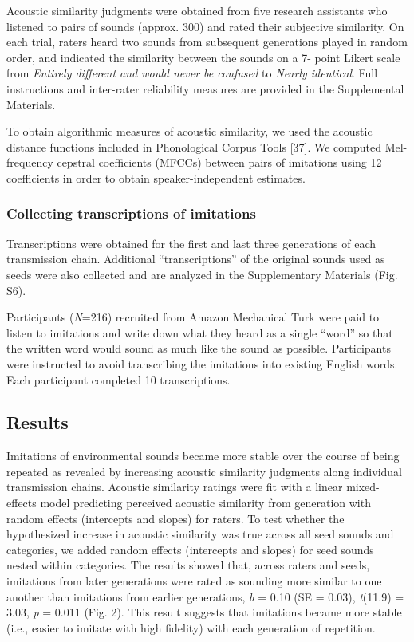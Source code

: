 \documentclass[english,floatsintext,man]{apa6}
\theoremstyle{definition}
\theoremstyle{definition}
\theoremstyle{definition}
\theoremstyle{remark}
\begin{document}
Acoustic similarity judgments were obtained from five research
assistants who listened to pairs of sounds (approx. 300) and rated their
subjective similarity. On each trial, raters heard two sounds from
subsequent generations played in random order, and indicated the
similarity between the sounds on a 7- point Likert scale from
\emph{Entirely different and would never be confused} to \emph{Nearly
identical}. Full instructions and inter-rater reliability measures are
provided in the Supplemental Materials.

To obtain algorithmic measures of acoustic similarity, we used the
acoustic distance functions included in Phonological Corpus Tools
{[}37{]}. We computed Mel-frequency cepstral coefficients (MFCCs)
between pairs of imitations using 12 coefficients in order to obtain
speaker-independent estimates.

\hypertarget{collecting-transcriptions-of-imitations}{%
\subsubsection{Collecting transcriptions of
imitations}\label{collecting-transcriptions-of-imitations}}

Transcriptions were obtained for the first and last three generations of
each transmission chain. Additional \enquote{transcriptions} of the
original sounds used as seeds were also collected and are analyzed in
the Supplementary Materials (Fig. S6).

Participants (\emph{N}=216) recruited from Amazon Mechanical Turk were
paid to listen to imitations and write down what they heard as a single
\enquote{word} so that the written word would sound as much like the
sound as possible. Participants were instructed to avoid transcribing
the imitations into existing English words. Each participant completed
10 transcriptions.

\hypertarget{results}{%
\subsection{Results}\label{results}}

Imitations of environmental sounds became more stable over the course of
being repeated as revealed by increasing acoustic similarity judgments
along individual transmission chains. Acoustic similarity ratings were
fit with a linear mixed-effects model predicting perceived acoustic
similarity from generation with random effects (intercepts and slopes)
for raters. To test whether the hypothesized increase in acoustic
similarity was true across all seed sounds and categories, we added
random effects (intercepts and slopes) for seed sounds nested within
categories. The results showed that, across raters and seeds, imitations
from later generations were rated as sounding more similar to one
another than imitations from earlier generations, \emph{b} = 0.10 (SE =
0.03), \emph{t}(11.9) = 3.03, \emph{p} = 0.011 (Fig. 2). This result
suggests that imitations became more stable (i.e., easier to imitate
with high fidelity) with each generation of repetition.
\end{document}
